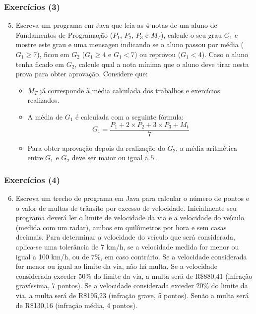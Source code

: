 \documentclass[xcolor={dvipsnames,table},aspectratio=169]{beamer}
\begin{document}
\begin{frame}\frametitle{Exercícios (3)}
\begin{enumerate}
	\setcounter{enumi}{4}
	\item Escreva um programa em Java que leia as 4 notas de um aluno de Fundamentos de Programação ($P_1$, $P_2$, $P_3$ e $M_T$), calcule o seu grau $G_1$ e mostre este grau e uma mensagen indicando se o aluno passou por média ($G_1 \ge 7$), ficou em $G_2$ ($G_1 \ge 4$ e $G_1 < 7$) ou reprovou ($G_1 < 4$). Caso o aluno tenha ficado em $G_2$, calcule qual a nota mínima que o aluno deve tirar nesta prova para obter aprovação.
	Considere que:
	\begin{itemize}
		\item $M_T$ já corresponde à média calculada dos trabalhos e exercícios realizados.
		\item A média de $G_1$ é calculada com a seguinte fórmula:
\[ G_1 = \frac{P_1 + 2 \times P_2 + 3 \times P_3 + M_t}{7} \]
		\item Para obter aprovação depois da realização do $G_2$, a média aritmética entre $G_1$ e $G_2$ deve ser maior ou igual a $5$.
	\end{itemize}
\end{enumerate}
\end{frame}

\begin{frame}\frametitle{Exercícios (4)}
\begin{enumerate}
	\setcounter{enumi}{5}
	\item Escreva um trecho de programa em Java para calcular o número de pontos e o valor de multas de trânsito por excesso de velocidade. Inicialmente seu programa deverá ler o limite de velocidade da via e a velocidade do veículo (medida com um radar), ambos em quilômetros por hora e sem casas decimais. Para determinar a velocidade do veículo que será considerada, aplica-se uma tolerância de 7 km/h, se a velocidade medida for menor ou igual a 100 km/h, ou de 7\%, em caso contrário. Se a velocidade considerada for menor ou igual ao limite da via, não há multa. Se a velocidade considerada exceder 50\% do limite da via, a multa será de R\$880,41 (infração gravíssima, 7 pontos). Se a velocidade considerada exceder 20\% do limite da via, a multa será de R\$195,23 (infração grave, 5 pontos). Senão a multa será de R\$130,16 (infração média, 4 pontos).
\end{enumerate}
\end{frame}
\end{document}

